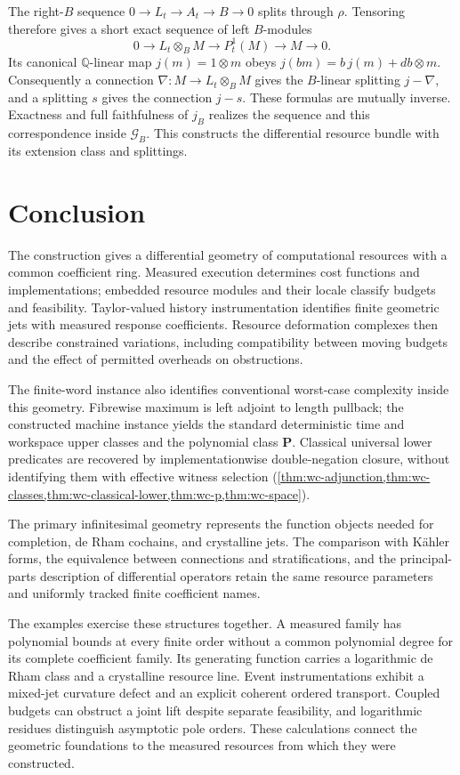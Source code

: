 \documentclass[11pt,a4paper]{article}
\numberwithin{algorithm}{section}
\numberwithin{equation}{section}
\theoremstyle{definition}
\theoremstyle{remark}
\theoremstyle{plain}
\newcommand{\QQ}{\mathbb Q}
\newcommand{\Geo}{\mathcal G_B}
\theoremstyle{definition}
\theoremstyle{plain}
\begin{document}
The right-$B$ sequence
$0\to L_t\to A_t\to B\to0$ splits through $\rho$.
Tensoring therefore gives a short exact sequence of left $B$-modules
\begin{equation}\label{eq:principal-parts}
 0\to L_t\otimes_BM\to P_t^1(M)\to M\to0.
\end{equation}
Its canonical $\QQ$-linear map $j(m)=1\otimes m$ obeys
$j(bm)=b\,j(m)+db\otimes m$.
Consequently a connection $\nabla:M\to L_t\otimes_BM$
gives the $B$-linear splitting $j-\nabla$, and a splitting
$s$ gives the connection $j-s$. These formulas are
mutually inverse. Exactness and full faithfulness of $j_B$
realizes the sequence and this correspondence inside
$\Geo$. This constructs the differential resource bundle
with its extension class and splittings.


\section{Conclusion}
\label{sec:conclusion}
The construction gives a differential geometry of computational
resources with a common coefficient ring. Measured
execution determines cost functions and implementations; embedded
resource modules and their locale classify budgets and feasibility.
Taylor-valued history instrumentation identifies finite geometric jets
with measured response coefficients. Resource deformation complexes
then describe constrained variations, including compatibility between
moving budgets and the effect of permitted overheads on obstructions.

The finite-word instance also identifies conventional worst-case
complexity inside this geometry. Fibrewise maximum is left adjoint
to length pullback; the constructed machine instance yields the
standard deterministic time and workspace upper classes and the
polynomial class $\mathbf P$. Classical universal lower predicates
are recovered by implementationwise double-negation closure,
without identifying them with effective witness selection
(\cref{thm:wc-adjunction,thm:wc-classes,thm:wc-classical-lower,thm:wc-p,thm:wc-space}).

The primary infinitesimal geometry represents the function objects
needed for completion, de Rham cochains, and crystalline jets.
The comparison with K\"ahler forms, the equivalence between
connections and stratifications, and the principal-parts description
of differential operators retain the same resource parameters and uniformly tracked finite coefficient names.

The examples exercise these structures together. A measured family has
polynomial bounds at every finite order without a common polynomial
degree for its complete coefficient family. Its generating function
carries a logarithmic de Rham class and a crystalline resource line.
Event instrumentations exhibit a mixed-jet curvature defect and an
explicit coherent ordered transport. Coupled budgets can obstruct a
joint lift despite separate feasibility, and logarithmic residues
distinguish asymptotic pole orders. These calculations connect the
geometric foundations to the measured resources from which they were
constructed.
\end{document}
